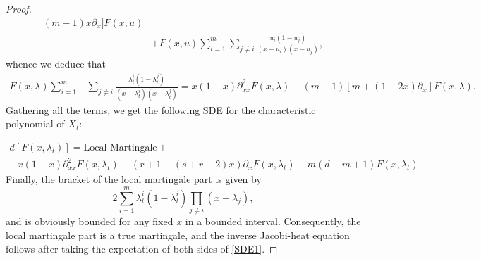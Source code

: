 \documentclass[10pt,a4paper]{amsart}
\begin{document}
\begin{proof}
\begin{align*}
		(m-1)x\partial_x]F(x, u)                                          \\& + F(x, u) \sum_{i=1}^m\sum_{j \neq i} \frac{u_i(1-u_j)}{(x-u_i)(x-u_j)},
	\end{align*}
	whence we deduce that
	\begin{align*}
		F(x, \lambda)  \sum_{i=1}^m & \sum_{j\neq i}\frac{\lambda_t^i(1-\lambda_t^j)}{(x-\lambda_t^i)(x-\lambda_t^j)} = x(1-x)\partial_{xx}^2F(x, \lambda)                                                                                                                        -(m-1)[m+(1-2x)\partial_x]F(x, \lambda).
	\end{align*}
	Gathering all the terms, we get the following SDE for the characteristic polynomial of $X_t$:

	\begin{multline}\label{SDE1}
		d[F(x,\lambda_t)]= \textrm{Local Martingale} +\\
		-x(1-x)\partial_{xx}^2F(x,\lambda_t) - (r+1-(s+r+2)x)\partial_x F(x,\lambda_t)
		- m(d-m+1)F(x,\lambda_t) %
	\end{multline}
	Finally, the bracket of the local martingale part is given by
	\begin{equation*}
		2\sum_{i=1}^m \lambda_t^i(1-\lambda_t^i)\prod_{j \neq i}(x-\lambda_j),
	\end{equation*}
	and is obviously bounded for any fixed $x$ in a bounded interval. Consequently, the local martingale part is a true martingale, and the inverse Jacobi-heat equation follows after taking the expectation of both sides of \eqref{SDE1}.
\end{proof}
\end{document}
